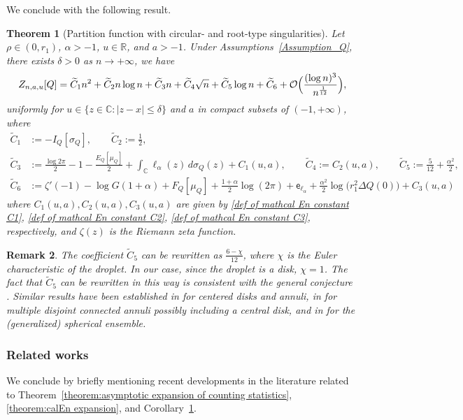 \documentclass[reqno]{amsart}
\newcommand{\1}{\mathds{1}}
\newcommand{\C}{\mathds{C}}
\newcommand{\R}{\mathds{R}}
\numberwithin{equation}{section}
\newtheorem{theorem}{Theorem}[section]
\newtheorem{remark}[theorem]{Remark}
\theoremstyle{definition}
\begin{document}
We conclude with the following result.
\begin{theorem}[Partition function with circular- and root-type singularities]
\label{corollary:partition function}
Let $\rho\in(0,r_1)$, $\alpha>-1$, $u\in\R$, and $a>-1$. 
Under Assumptions~\ref{Assumption_Q}, there exists $\delta>0$ as $n\to+\infty$, we have   
\[
Z_{n,a,u}[Q]
=
\widetilde{C}_1n^2+\widetilde{C}_2n\log n+\widetilde{C}_3n+\widetilde{C}_4\sqrt{n}+\widetilde{C}_5\log n+\widetilde{C}_6+\mathcal{O}\Bigl(\frac{(\log n)^3}{n^{\frac{1}{12}}}\Bigr), 
\]
uniformly for $u\in\{z\in\C:|z-x|\leq\delta\}$ and $a$ in compact subsets of $(-1,+\infty)$, where 
\begin{align*}
\widetilde{C}_1&:=-I_Q[\sigma_Q],
\qquad
\widetilde{C}_2:=\frac{1}{2}, 
\\
\widetilde{C}_3&:=\frac{\log 2\pi}{2}-1-\frac{E_Q[\mu_Q]}{2}+\int_{\C}\ell_{\alpha}(z)\,d\sigma_Q(z)+C_1(u,a),
\qquad
\widetilde{C}_4:=C_2(u,a),
\qquad
\widetilde{C}_5:=\frac{5}{12}+\frac{\alpha^2}{2}, 
\\
\widetilde{C}_6&:=\zeta'(-1)-\log G(1+\alpha)+F_Q[\mu_Q]+\frac{1+\alpha}{2}\log(2\pi)+\mathsf{e}_{\ell_{\alpha}}
    +\frac{\alpha^2}{2}\log\bigl(r_1^2\Delta Q(0)\bigr)+C_3(u,a)
\end{align*}
where $C_1(u,a),C_2(u,a),C_3(u,a)$ are given by \eqref{def of mathcal En constant C1}, \eqref{def of mathcal En constant C2}, \eqref{def of mathcal En constant C3}, respectively, and $\zeta(z)$ is the Riemann zeta function. 
\end{theorem}

\begin{remark}
The coefficient $\widetilde{C}_5$ can be rewritten as $\frac{6-\chi}{12}$,  where $\chi$ is the Euler characteristic of the droplet. In our case, since the droplet is a disk, $\chi=1$. The fact that $\widetilde{C}_5$ can be rewritten in this way is consistent with the general conjecture \cite{ZW2006}. 
Similar results have been established in \cite{BKS2023} for centered disks and annuli, in \cite{ACC2023c} for multiple disjoint connected annuli possibly including a central disk, and in \cite{BKSY2025} for the (generalized) spherical ensemble.
\end{remark}


\subsubsection*{Related works}
We conclude by briefly mentioning recent developments in the literature related to Theorem~\ref{theorem:asymptotic expansion of counting statistics}, \ref{theorem:calEn expansion}, and Corollary~\ref{corollary:partition function}.
\end{document}
